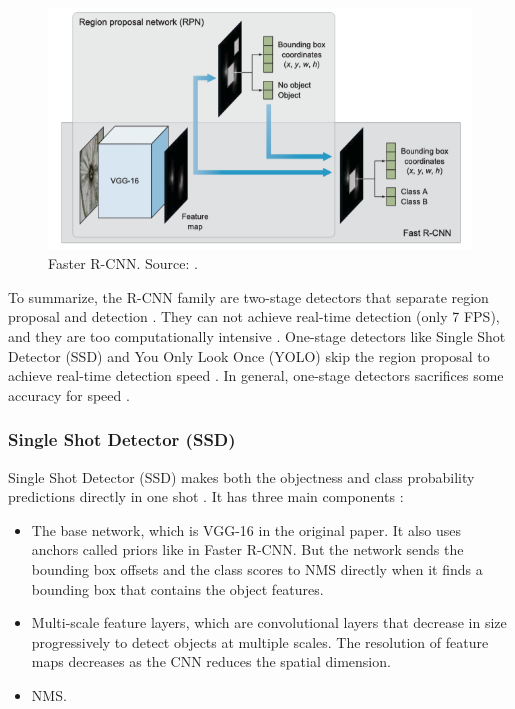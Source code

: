\documentclass[a4paper,11pt,oneside]{article}
\begin{document}
  \begin{figure}[ht]
    \begin{center}
      \includegraphics[width=.8\textwidth]{faster_r_cnn.png}
    \end{center}
    \caption{Faster R-CNN. Source: \cite{elgendy2020deep}.}
  \end{figure}

  To summarize, the R-CNN family are two-stage detectors that separate region proposal and detection \cite{elgendy2020deep}.
  They can not achieve real-time detection (only 7 FPS), and they are too computationally intensive
  \cite{elgendy2020deep, liu2016ssd, redmon2016you}. One-stage detectors like Single Shot Detector (SSD) and You Only
  Look Once (YOLO) skip the region proposal to achieve real-time detection speed \cite{elgendy2020deep}. In general,
  one-stage detectors sacrifices some accuracy for speed \cite{elgendy2020deep, lin2017focal}.

  \subsubsection{Single Shot Detector (SSD)}

  Single Shot Detector (SSD) makes both the objectness and class probability predictions directly in one shot
  \cite{elgendy2020deep, liu2016ssd}. It has three main components \cite{elgendy2020deep, liu2016ssd}:

  \begin{itemize}
    \item The base network, which is VGG-16 in the original paper. It also uses anchors called priors like in Faster R-CNN.
    But the network sends the bounding box offsets and the class scores to NMS directly when it finds a bounding box that
    contains the object features.
    \item Multi-scale feature layers, which are convolutional layers that decrease in size progressively to detect objects
    at multiple scales. The resolution of feature maps decreases as the CNN reduces the spatial dimension.
    \item NMS.
  \end{itemize}
\end{document}
